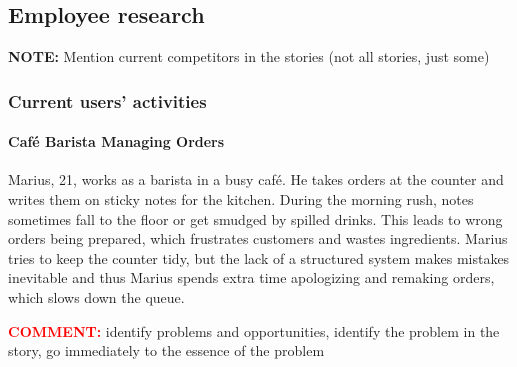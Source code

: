 \documentclass[]{VUMIFTemplateClass}
\newcommand{\yellowcomment}[1]{%
    \begin{tcolorbox}[colback=yellow!80, colframe=yellow!80, arc=0pt, outer arc=0pt, boxrule=0pt, left=3pt, right=3pt, top=3pt, bottom=3pt]
        \textbf{\textcolor{red}{COMMENT:}} #1
    \end{tcolorbox}
}
\newcommand{\noticecomment}[1]{%
    \begin{tcolorbox}[colback=blue!20, colframe=blue!60, arc=0pt, outer arc=0pt, boxrule=1pt, left=3pt, right=3pt, top=3pt, bottom=3pt]
        \textbf{\textcolor{blue!70!black}{NOTE:}} #1
    \end{tcolorbox}
}
\newcommand{\subsubsubsection}[1]{\paragraph{#1}}
\begin{document}



\subsection{Employee research}
\noticecomment{Mention current competitors in the stories (not all stories, just some)}

\subsubsection{Current users' activities}

\subsubsubsection{Café Barista Managing Orders}

Marius, 21, works as a barista in a busy café. He takes orders at the counter
and writes them on sticky notes for the kitchen. During the morning rush, notes
sometimes fall to the floor or get smudged by spilled drinks. This leads to
wrong orders being prepared, which frustrates customers and wastes ingredients.
Marius tries to keep the counter tidy, but the lack of a structured system makes
mistakes inevitable and thus Marius spends extra time apologizing and remaking
orders, which slows down the queue.

\yellowcomment{identify problems and opportunities, identify the problem in the story, go immediately to the essence of the problem}
\end{document}
